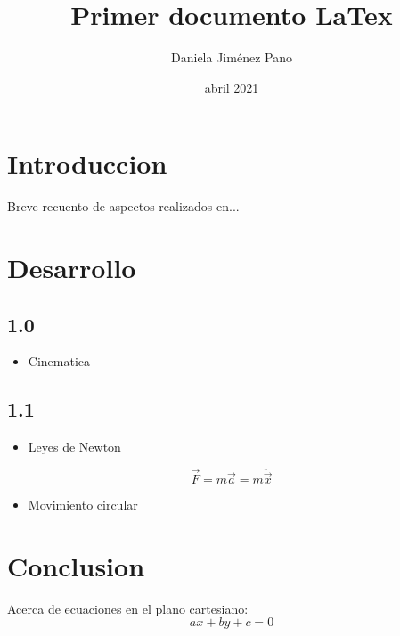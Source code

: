 \documentclass[12pt]{article}
\title{Primer documento LaTex}
\author{Daniela Jiménez Pano}
\date{abril 2021}
\begin{document}
\maketitle{}
\tableofcontents{}
\section{Introduccion}
Breve recuento de aspectos realizados en...


\section{Desarrollo}
\subsection{1.0}
\begin{itemize}
\item Cinematica
\end{itemize}

\subsection{1.1}
\begin{itemize}
\item Leyes de Newton
\end{itemize}
\begin{equation}
\vec{F}=m\vec{a}= m \ddot{\vec x}
\end{equation}

\begin{itemize}
\item Movimiento circular
\end{itemize}

\section{Conclusion}
Acerca de ecuaciones en el plano cartesiano:
\begin{equation}
ax+by+c=0
\end{equation}
\end{document}
